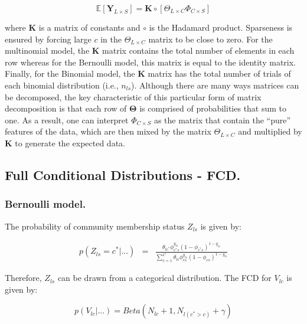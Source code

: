 \documentclass[article]{jss}
\begin{document}
\begin{equation}
\mathbb{E}[\mathbf{Y}_{L\times S}]=\mathbf{K}\circ[\Theta_{L\times C}\Phi_{C\times S}]
    \label{eq:eq0004} 
\end{equation}

where \(\mathbf{K}\) is a matrix of constants and \(\circ\) is the
Hadamard product. Sparseness is ensured by forcing large \(c\) in the
\(\Theta_{L\times C}\) matrix to be close to zero. For the multinomial
model, the \(\mathbf{K}\) matrix contains the total number of elements
in each row whereas for the Bernoulli model, this matrix is equal to the
identity matrix. Finally, for the Binomial model, the \(\mathbf{K}\)
matrix has the total number of trials of each binomial distribution
(i.e., \(n_{ls}\)). Although there are many ways matrices can be
decomposed, the key characteristic of this particular form of matrix
decomposition is that each row of \(\mathbf{\Theta}\) is comprised of
probabilities that sum to one. As a result, one can interpret
\(\Phi_{C\times S}\) as the matrix that contain the ``pure'' features of
the data, which are then mixed by the matrix \(\Theta_{L\times C}\) and
multiplied by \(\mathbf{K}\) to generate the expected data.

\subsection{Full Conditional Distributions -
FCD.}\label{full-conditional-distributions---fcd.}

\subsubsection{Bernoulli model.}\label{bernoulli-model.}

The probability of community membership status \(Z_{ls}\) is given by:

\begin{equation}
\begin{array}{lll}
p(Z_{ls}=c^{*}|...)&=&\frac{\theta_{lc^{*}}\phi_{c^{*}s}^{y_{ls}}(1-\phi_{c^{*}s})^{1-y_{ls}}}{\displaystyle\sum_{c=1}^{C}\theta_{lc}\phi_{cs}^{y_{ls}}(1-\phi_{cs})^{1-y_{ls}}}
\end{array}
\label{eq:eq0005} 
\end{equation}

Therefore, \(Z_{ls}\) can be drawn from a categorical distribution. The
FCD for \(V_{lc}\) is given by:

\[
p(V_{lc}|...)=Beta(N_{lc}+1,N_{l(c^{*}>c)}+\gamma)
\]
\end{document}
